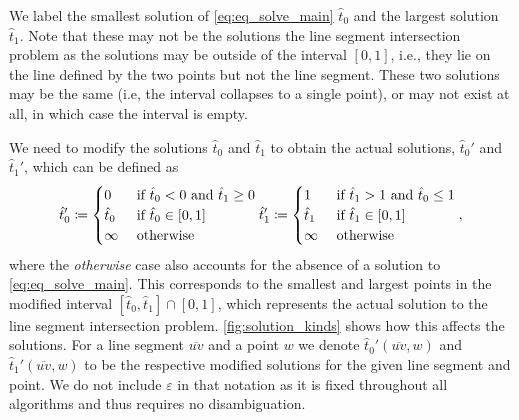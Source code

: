 We label the smallest solution of \cref{eq:eq_solve_main} \(\hat{t}_0\) and the largest solution \(\hat{t}_1\). Note that these may not be the solutions the line segment intersection problem as the solutions may be outside of the interval \([0, 1]\), i.e., they lie on the line defined by the two points but not the line segment. These two solutions may be the same (i.e, the interval collapses to a single point), or may not exist at all, in which case the interval is empty.

We need to modify the solutions \(\hat{t}_0\) and \(\hat{t}_1\) to obtain the actual solutions, \(\hat{t}_0'\) and \(\hat{t}_1'\), which can be defined as 
\begin{equation}
  \hat{t}_0' \coloneq \begin{cases}
    0 & \textrm{ if } \hat{t}_0 < 0 \textrm{ and } \hat{t}_1 \geq 0\\
    \hat{t}_0 & \textrm{ if } \hat{t}_0 \in [0, 1]\\
    \infty &\textrm{ otherwise }
  \end{cases}\\
  \hat{t}_1' \coloneq \begin{cases}
    1 & \textrm{ if } \hat{t}_1 > 1 \textrm{ and } \hat{t}_0 \leq 1\\
    \hat{t}_1 & \textrm{ if } \hat{t}_1 \in [0, 1]\\
    \infty &\textrm{ otherwise }
  \end{cases},
\end{equation}
where the \emph{otherwise} case also accounts for the absence of a solution to \cref{eq:eq_solve_main}. This corresponds to the smallest and largest points in the modified interval \([\hat t_0, \hat t_1] \cap [0, 1]\), which represents the actual solution to the line segment intersection problem. \cref{fig:solution_kinds} shows how this affects the solutions.
For a line segment \(\overline{uv}\) and a point \(w\) we denote \(\hat t_0'(\overline{uv}, w)\) and \(\hat t_1'(\overline{uv}, w)\) to be the respective modified solutions for the given line segment and point. We do not include \(\varepsilon\) in that notation as it is fixed throughout all algorithms and thus requires no disambiguation.

